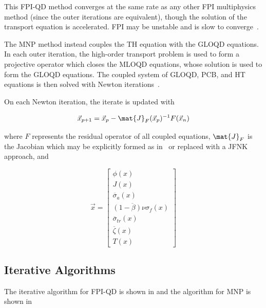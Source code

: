 \documentclass{proposal}
\begin{document}
This FPI-QD method converges at the same rate as any other FPI multiphysics method (since the outer iterations are equivalent), though the solution of the transport equation is accelerated. FPI may be unstable and is slow to converge~\cite{adamowicz2021nilo}.

The MNP method instead couples the TH equation with the GLOQD equations. In each outer iteration, the high-order transport problem is used to form a projective operator which closes the MLOQD equations, whose solution is used to form the GLOQD equations. The coupled system of GLOQD, PCB, and HT equations is then solved with Newton iterations~\cite{ragusa2009consistent}. 

On each Newton iteration, the iterate is updated with

\begin{equation}
    \vec{x}_{p+1} = \vec{x}_p - \mat{J}_F(\vec{x}_p)^{-1} F(\vec{x}_n)
\end{equation}

where $F$ represents the residual operator of all coupled equations, $\mat{J}_F$ is the Jacobian which may be explicitly formed as in~\cite{tamang2014multilevel} or replaced with a JFNK approach, and 

\begin{equation}
    \vec{x} = \begin{bmatrix}
        \phi(x)\\
        J(x)\\
        \overline{\sigma}_a(x)\\
        \overline{(1-\beta)\nu\sigma_f}(x)\\
        \overline{\sigma}_{tr}(x)\\
        \overline{\zeta}(x)\\
        T(x)
    \end{bmatrix}
\end{equation}

\subsection{Iterative Algorithms}

The iterative algorithm for FPI-QD is shown in and the algorithm for MNP is shown in 

\begin{algorithm}[h]\caption{QD Fixed-Point Iteration Multiphysics}\label{alg:fpi-qd}
\end{algorithm}
\end{document}
